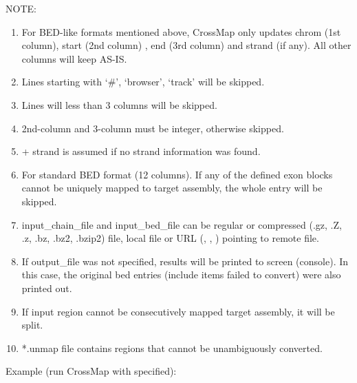 \documentclass[letterpaper,10pt,english]{sphinxmanual}
\begin{document}
NOTE:
\begin{enumerate}
\item {} 
For BED-like formats mentioned above, CrossMap only updates \sphinxquotedblleft{}chrom (1st column)\sphinxquotedblright{}, \sphinxquotedblleft{}start (2nd column) \sphinxquotedblright{}, \sphinxquotedblleft{}end (3rd column) \sphinxquotedblright{} and \sphinxquotedblleft{}strand\sphinxquotedblright{} (if any). All other columns will keep AS-IS.

\item {} 
Lines starting with `\#', `browser', `track' will be skipped.

\item {} 
Lines will less than 3 columns will be skipped.

\item {} 
2nd-column and 3-column must be integer, otherwise skipped.

\item {} 
\sphinxquotedblleft{}+\sphinxquotedblright{} strand is assumed if no strand information was found.

\item {} 
For standard BED format (12 columns). If any of the defined exon blocks cannot be uniquely mapped to target assembly, the whole entry will be skipped.

\item {} 
\sphinxquotedblleft{}input\_chain\_file\sphinxquotedblright{} and \sphinxquotedblleft{}input\_bed\_file\sphinxquotedblright{} can be regular or compressed (.gz, .Z, .z, .bz, .bz2, .bzip2) file, local file or URL (, , ) pointing to remote file.

\item {} 
If output\_file was not specified, results will be printed to screen (console). In this case, the original bed entries (include items failed to convert) were also printed out.

\item {} 
If input region cannot be consecutively mapped target assembly, it will be split.

\item {} 
*.unmap file contains regions that cannot be unambiguously converted.

\end{enumerate}

Example (run CrossMap with   specified):
\end{document}
